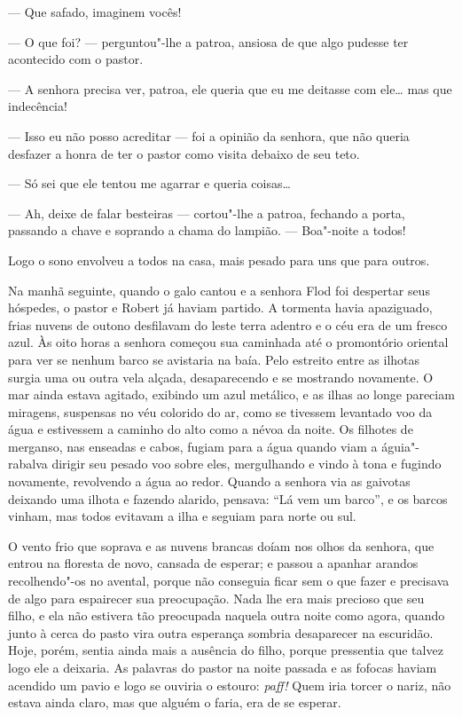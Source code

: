 --- Que safado, imaginem vocês!

--- O que foi? --- perguntou"-lhe a patroa, ansiosa de que algo pudesse ter acontecido com o
pastor.

--- A senhora precisa ver, patroa, ele queria que eu me deitasse com ele\ldots{} mas que
indecência!

--- Isso eu não posso acreditar --- foi a opinião da senhora, que não queria
desfazer a honra de ter o pastor como visita debaixo de seu teto.

--- Só sei que ele tentou me agarrar e queria coisas\ldots{}

--- Ah, deixe de falar besteiras --- cortou"-lhe a patroa, fechando a porta,
passando a chave e soprando a chama do lampião. --- Boa"-noite a todos!

Logo o sono envolveu a todos na casa, mais pesado para uns que para outros.

Na manhã seguinte, quando o galo cantou e a senhora Flod foi despertar seus
hóspedes, o pastor e Robert já haviam partido. A tormenta havia apaziguado,
frias nuvens de outono desfilavam do leste terra adentro e o céu era de um
fresco azul. Às oito horas a senhora começou sua caminhada até o promontório
oriental para ver se nenhum barco se avistaria na baía. Pelo estreito entre as
ilhotas surgia uma ou outra vela alçada, desaparecendo e se mostrando novamente. O
mar ainda estava agitado, exibindo um azul metálico, e as ilhas ao longe
pareciam miragens, suspensas no véu colorido do ar, como se tivessem levantado
voo da água e estivessem a caminho do alto como a névoa da noite. Os filhotes de
merganso, nas enseadas e cabos, fugiam para a água quando viam a águia"-rabalva
dirigir seu pesado voo sobre eles, mergulhando e vindo à tona e fugindo
novamente, revolvendo a água ao redor. Quando a senhora via as gaivotas deixando
uma ilhota e fazendo alarido, pensava: ``Lá vem um barco'', e os barcos vinham, mas
todos evitavam a ilha e seguiam para norte ou sul.

O vento frio que soprava e as nuvens brancas doíam nos olhos da senhora, que
entrou na floresta de novo, cansada de esperar; e passou a apanhar arandos
recolhendo"-os no avental, porque não conseguia ficar sem o que fazer e
precisava de algo para espairecer sua preocupação. Nada lhe era mais precioso
que seu filho, e ela não estivera tão preocupada naquela outra noite como agora, 
quando junto à cerca do pasto vira outra esperança sombria desaparecer
na escuridão. Hoje, porém, sentia ainda mais a ausência do filho, porque pressentia
que talvez logo ele a deixaria. As palavras do pastor na noite passada e as
fofocas haviam acendido um pavio e logo se ouviria o estouro: \textit{paff!} Quem iria torcer o
nariz, não estava ainda claro, mas que alguém o faria, era de se esperar.

